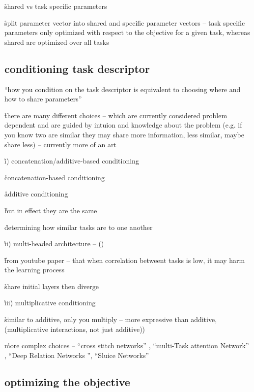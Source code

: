 \r{shared vs task specific parameters}

\r{split parameter vector into shared and specific parameter vectors --  task specific parameters only optimized with respect to the objective for a given task, whereas shared are optimized over all tasks}

\subsection{conditioning task descriptor}

\r{``how you condition on the task descriptor is equivalent to choosing where and how to share parameters''}

\r{there are many different choices -- which are currently considered problem dependent and are guided by intuion and knowledge about the problem (e.g. if you know two are similar they may share more information, less similar, maybe share less) -- currently more of an art}

\r{i) concatenation/additive-based conditioning}

\r{concatenation-based conditioning}


\r{additive conditioning}


\r{but in effect they are the same}

\r{determining how similar tasks are to one another}

\r{ii) multi-headed architecture -- ()}

\r{from youtube paper -- that when correlation betweent tasks is low, it may harm the learning process}

\r{share initial layers then diverge}

\r{iii) multiplicative conditioning}

\r{similar to additive, only you multiply -- more expressive than additive, (multiplicative interactions, not just additive))}

\r{more complex choices -- ``cross stitch networks'' , ``multi-Task attention Network'' , ``Deep Relation Networks '', ``Sluice Networks'' }

\subsection{optimizing the objective}

